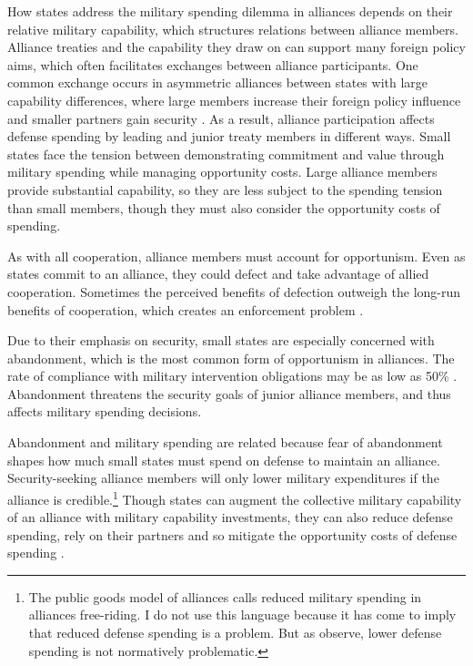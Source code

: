 \documentclass[12pt]{article}
\begin{document}
How states address the military spending dilemma in alliances depends on their relative military capability, which structures relations between alliance members. 
Alliance treaties and the capability they draw on can support many foreign policy aims, which often facilitates exchanges between alliance participants. 
One common exchange occurs in asymmetric alliances between states with large capability differences, where large members increase their foreign policy influence and smaller partners gain security \citep{Morrow1991}. 
As a result, alliance participation affects defense spending by leading and junior treaty members in different ways. 
Small states face the tension between demonstrating commitment and value through military spending while managing opportunity costs. 
Large alliance members provide substantial capability, so they are less subject to the spending tension than small members, though they must also consider the opportunity costs of spending. 


As with all cooperation, alliance members must account for opportunism. 
Even as states commit to an alliance, they could defect and take advantage of allied cooperation. 
Sometimes the perceived benefits of defection outweigh the long-run benefits of cooperation, which creates an enforcement problem \citep{Fearon1998a, Koremenosetal2001}.


Due to their emphasis on security, small states are especially concerned with abandonment, which is the most common form of opportunism in alliances.
The rate of compliance with military intervention obligations may be as low as 50\% \citep{BerkemeierFuhrmann2018}.
Abandonment threatens the security goals of junior alliance members, and thus affects military spending decisions. 


Abandonment and military spending are related because fear of abandonment shapes how much small states must spend on defense to maintain an alliance. 
Security-seeking alliance members will only lower military expenditures if the alliance is credible.\footnote{The public goods model of alliances calls reduced military spending in alliances free-riding. I do not use this language because it has come to imply that reduced defense spending is a problem. But as \citet[pg. 278]{OlsonZeckhauser1966} observe, lower defense spending is not normatively problematic.}
Though states can augment the collective military capability of an alliance with military capability investments, they can also reduce defense spending, rely on their partners and so mitigate the opportunity costs of defense spending \citep{OlsonZeckhauser1966, Morrow1993, Conybeare1994, SandlerHartley2001}. 
\end{document}
